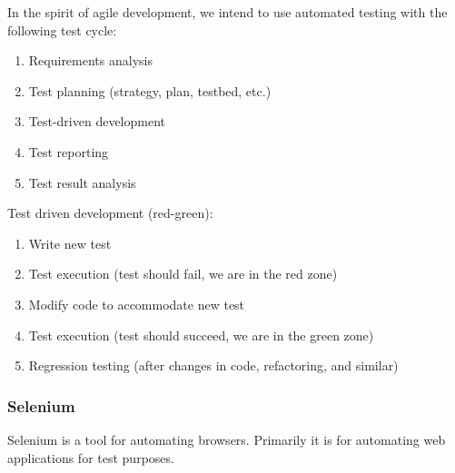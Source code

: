 In the spirit of agile development, we intend to use automated testing with the
following test cycle:

\begin{enumerate}
	\item Requirements analysis
	\item Test planning (strategy, plan, testbed, etc.)
	\item Test-driven development
	\item Test reporting
	\item Test result analysis
\end{enumerate}

Test driven development (red-green):
\begin{enumerate}
	\item Write new test
	\item Test execution (test should fail, we are in the red zone)
	\item Modify code to accommodate new test
	\item Test execution (test should succeed, we are in the green zone)
	\item Regression testing (after changes in code, refactoring, and similar)
\end{enumerate}

\subsubsection{Selenium}

	Selenium is a tool for automating browsers. Primarily it is for automating
	web applications for test purposes. \cite{seleniumhq:home}
